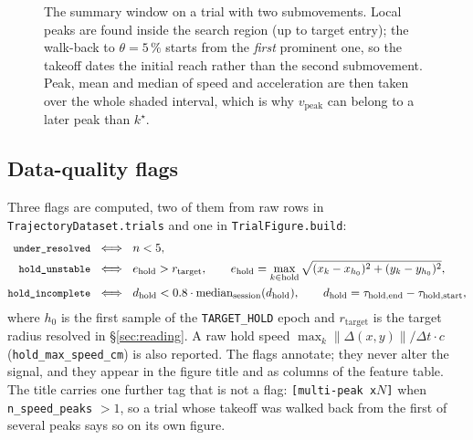 \documentclass[11pt,a4paper]{article}
\newcommand{\code}[1]{\texttt{\small #1}}
\begin{document}
\begin{figure}[htbp]
{}
\caption{The summary window on a trial with two submovements. Local peaks are
found inside the search region (up to target entry); the walk-back to
$\theta = 5\,\%$ starts from the \emph{first} prominent one, so the takeoff
dates the initial reach rather than the second submovement. Peak, mean and
median of speed and acceleration are then taken over the whole shaded interval,
which is why $v_{\text{peak}}$ can belong to a later peak than $k^\star$.}
\label{fig:summarywindow}
\end{figure}

\subsection{Data-quality flags}
\label{sec:flags}

Three flags are computed, two of them from raw rows in
\code{TrajectoryDataset.trials} and one in \code{TrialFigure.build}:
\begin{align}
  \code{under\_resolved} \ &\iff\ n < 5, \label{eq:flag1}\\
  \code{hold\_unstable} \ &\iff\ e_{\text{hold}} > r_{\text{target}},
    \qquad e_{\text{hold}} = \max_{k \in \text{hold}} \sqrt{(x_k - x_{h_0})^2 + (y_k - y_{h_0})^2},
    \label{eq:flag2}\\
  \code{hold\_incomplete} \ &\iff\ d_{\text{hold}} < 0.8\cdot\operatorname{median}_{\text{session}}(d_{\text{hold}}),
    \qquad d_{\text{hold}} = \tau_{\text{hold,end}} - \tau_{\text{hold,start}},
    \label{eq:flag3}
\end{align}
where $h_0$ is the first sample of the \code{TARGET\_HOLD} epoch and
$r_{\text{target}}$ is the target radius resolved in \S\ref{sec:reading}. A raw
hold speed $\max_k \|\Delta(x,y)\|/\Delta t \cdot c$
(\code{hold\_max\_speed\_cm}) is also reported. The flags annotate; they never
alter the signal, and they appear in the figure title and as columns of the
feature table. The title carries one further tag that is not a flag:
\code{[multi-peak x}$N$\code{]} when \code{n\_speed\_peaks} $> 1$, so a trial
whose takeoff was walked back from the first of several peaks says so on its own
figure.
\end{document}
